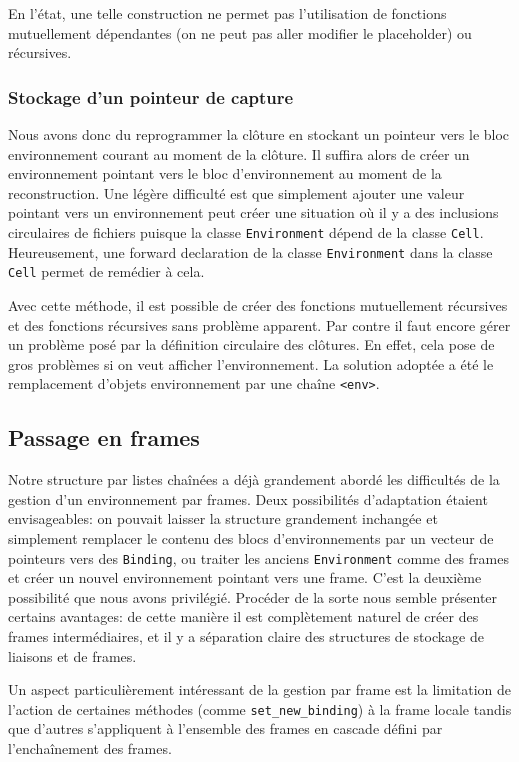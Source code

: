 \documentclass[a4paper,11pt]{article}
\begin{document}
En l'état, une telle construction ne permet pas l'utilisation de fonctions
mutuellement dépendantes (on ne peut pas aller modifier le placeholder) ou
récursives.

\subsubsection{Stockage d'un pointeur de capture}

Nous avons donc du reprogrammer la clôture en stockant un pointeur vers le bloc
environnement courant au moment de la clôture. Il suffira alors de créer un
environnement pointant vers le bloc d'environnement au moment de la reconstruction.
Une légère difficulté est que simplement ajouter une valeur pointant vers un
environnement peut créer une situation où il y a des inclusions circulaires de
fichiers puisque la classe \texttt{Environment} dépend de la classe \texttt{Cell}.
Heureusement, une forward declaration de la classe \texttt{Environment} dans la classe
\texttt{Cell} permet de remédier à cela.

Avec cette méthode, il est possible de créer des fonctions mutuellement
récursives et des fonctions récursives sans problème apparent. Par contre il
faut encore gérer un problème posé par la définition circulaire des clôtures.
En effet, cela pose de gros problèmes si on veut afficher l'environnement. La
solution adoptée a été le remplacement d'objets environnement par une chaîne
\texttt{<env>}.

\subsection{Passage en frames}

Notre structure par listes chaînées a déjà grandement abordé les difficultés de la
gestion d'un environnement par frames. Deux possibilités d'adaptation étaient
envisageables: on pouvait laisser la structure grandement inchangée et
simplement remplacer le contenu des blocs d'environnements par un vecteur de
pointeurs vers des \texttt{Binding}, ou traiter les anciens
\texttt{Environment} comme des frames et créer un nouvel environnement pointant
vers une frame. C'est la deuxième possibilité que nous avons privilégié.
Procéder de la sorte nous semble présenter certains avantages: de cette manière
il est complètement naturel de créer des frames intermédiaires, et il y a
séparation claire des structures de stockage de liaisons et de frames.

Un aspect particulièrement intéressant de la gestion par frame est la limitation
de l'action de certaines méthodes (comme \texttt{set\_new\_binding}) à la frame
locale tandis que d'autres s'appliquent à l'ensemble des frames en cascade
défini par l'enchaînement des frames.
\end{document}
